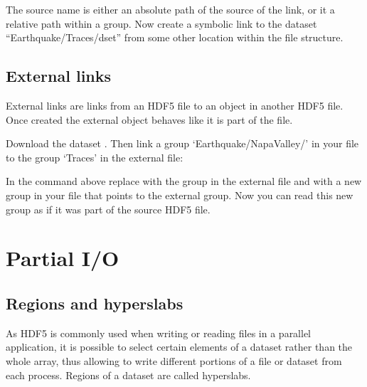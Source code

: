 \documentclass[letterpaper,10pt,english]{sphinxmanual}
\begin{document}
\sphinxAtStartPar
The source name is either an absolute path of the source of the link, or it a relative path within a group. Now create a symbolic link to the dataset “Earthquake/Traces/dset” from some other location within the file structure.


\section{External links}
\label{\detokenize{index:external-links}}
\sphinxAtStartPar
External links are links from an HDF5 file to an object in another HDF5 file.
Once created the external object behaves like it is part of the file.

\sphinxAtStartPar
Download the dataset .
Then link a group ‘Earthquake/NapaValley/’ in your file to the group ‘Traces’ in the external file:

\begin{sphinxVerbatim}[commandchars=\\\{\}]
\PYG{p}{[}\PYG{p}{]}   
\end{sphinxVerbatim}

\sphinxAtStartPar
In the command above replace  with the group in the external file and 
with a new group in your file that points to the external group.
Now you can read this new group as if it was part of the source HDF5 file.


\chapter{Partial I/O}
\label{\detokenize{index:partial-i-o}}

\section{Regions and hyperslabs}
\label{\detokenize{index:regions-and-hyperslabs}}
\sphinxAtStartPar
As HDF5 is commonly used when writing or reading files in a parallel application,
it is possible to select certain elements of a dataset rather than the whole array,
thus allowing to write different portions of a file or dataset from each process.
Regions of a dataset are called hyperslabs.
\end{document}
